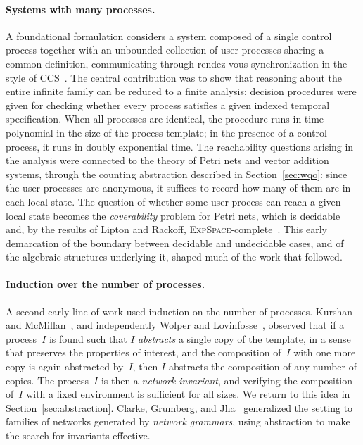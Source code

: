 \paragraph{Systems with many processes.}
A foundational formulation considers a system composed of a single control
process together with an unbounded collection of user processes sharing a
common definition, communicating through rendez-vous synchronization in the
style of CCS~\cite{GerSis92}. The central contribution was to show that
reasoning about the entire infinite family can be reduced to a finite analysis:
decision procedures were given for checking whether every process satisfies a
given indexed temporal specification. When all processes are identical, the
procedure runs in time polynomial in the size of the process template; in the
presence of a control process, it runs in doubly exponential time. The
reachability questions arising in the analysis were connected to the theory of
Petri nets and vector addition systems, through the counting abstraction
described in Section~\ref{sec:wqo}: since the user processes are anonymous, it
suffices to record how many of them are in each local state. The question of
whether some user process can reach a given local state becomes the
\emph{coverability} problem for Petri nets, which is decidable and, by the
results of Lipton and Rackoff, \textsc{ExpSpace}-complete~\cite{Rac78,Esp98}.
This early demarcation of the boundary between decidable and undecidable cases,
and of the algebraic structures underlying it, shaped much of the work that
followed.

\paragraph{Induction over the number of processes.}
A second early line of work used induction on the number of processes. Kurshan
and McMillan~\cite{KM89}, and independently Wolper and
Lovinfosse~\cite{WL89}, observed that if a process~$I$ is found such that $I$
\emph{abstracts} a single copy of the template, in a sense that preserves the
properties of interest, and the composition of~$I$ with one more copy is again
abstracted by~$I$, then $I$ abstracts the composition of any number of copies.
The
process~$I$ is then a \emph{network invariant}, and verifying the composition
of~$I$ with a fixed environment is sufficient for all sizes. We return to this
idea in Section~\ref{sec:abstraction}. Clarke, Grumberg, and
Jha~\cite{CGJ97} generalized the setting to families of networks generated by
\emph{network grammars}, using abstraction to make the search for invariants
effective.

